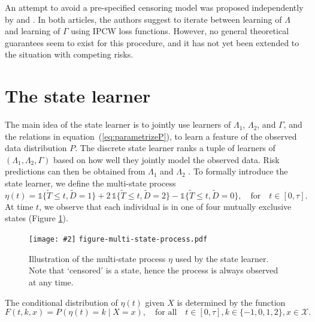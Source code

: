 \documentclass[unnumsec,webpdf,contemporary,large,namedate]{oup-authoring-template}%
\theoremstyle{thmstyleone}%
\theoremstyle{thmstyletwo}%
\theoremstyle{thmstylethree}%
\newcommand{\includeFigCond}[2][]{
  \ifx\nofig\undefined %
    \texttt{[image: \#2]} %
  \else %
    \texttt{#2} %
  \fi %
}
\newcommand{\1}{\mathds{1}}
\begin{document}
An attempt to avoid a pre-specified censoring model was proposed
independently by \cite{han2021inverse} and
\cite{westling2021inference}. In both articles, the authors suggest to
iterate between learning of \( \Lambda \) and learning of $\Gamma$
using IPCW loss functions. However, no general theoretical guarantees
seem to exist for this procedure, and it has not yet been extended to
the situation with competing risks.

\section{The state learner}
\label{sec:super-learner-simple}

The main idea of the state learner is to jointly use learners of
\( \Lambda_1 \), \( \Lambda_2 \), and \( \Gamma \), and the relations in
equation~(\ref{eq:parametrizeP}), to learn a feature of the observed data
distribution \( P \). The discrete state learner ranks a tuple of learners of
\( (\Lambda_1, \Lambda_2, \Gamma) \) based on how well they jointly model the
observed
data.
Risk predictions can then be obtained from
\( \Lambda_1 \) and $\Lambda_2$ \citep{benichou1990estimates, ozenne2017riskregression}. To formally
introduce the state learner, we define the multi-state process
\begin{equation*}
  \eta(t) = \1\{\tilde{T} \leq t, \tilde D=1\} + 2\,\1\{\tilde{T} \leq t, \tilde
  D=2\} - \1\{\tilde{T} \leq t, \tilde D=0\},
  \quad \text{for} \quad t \in [0, \tau].
\end{equation*}
At time \(t\), we observe that each individual is in one of four
mutually exclusive states (Figure \ref{fig:multi-state-process}).
\begin{figure}[h]
  \centering %
  \includeFigCond[width=.3\textwidth]{figure-multi-state-process.pdf}
  \caption{Illustration of the multi-state process \(\eta\) used by
    the state learner. Note that `censored' is a state, hence the
    process is always observed at any time.}
  \label{fig:multi-state-process}
\end{figure}
The conditional distribution of \( \eta(t) \) given \( X \) is determined by
the function
\begin{equation}
  \label{eq:F-def}
  F(t, k, x) = P(\eta(t) = k \mid X=x),
  \quad \text{for all} \quad
  t \in [0,\tau],
  k \in \{-1,0,1,2\},
  x \in \mathcal{X}.
\end{equation}
\end{document}
